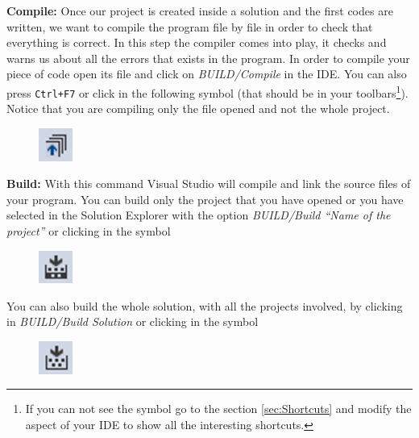 \begin{enumerate}
    \textbf{Compile:} Once our project is created inside a solution and the first codes are written, we want to compile the program file by file in order to check that everything is correct. In this step the compiler comes into play, it checks and warns us about all the errors that exists in the program. In order to compile your piece of code open its file and click on \textit{BUILD/Compile} in the IDE. You can also press \texttt{Ctrl+F7} or click in the following symbol (that should be in your toolbars\footnote{If you can not see the symbol go to the section \ref{sec:Shortcuts} and modify the aspect of your IDE to show all the interesting shortcuts.}). Notice that you are compiling only the file opened and not the whole project.
    
    \begin{figure}[H]
        \centering
        \includegraphics[width= 0.1\textwidth]{Figures/CompileSymbol}
    \end{figure}
    
    \textbf{Build:} With this command Visual Studio will compile and link the source files of your program. You can build only the project that you have opened or you have selected in the Solution Explorer with the option \textit{BUILD/Build ``Name of the project''} or clicking in the symbol 
    
    \begin{figure}[H]
        \centering
        \includegraphics[width= 0.1\textwidth]{Figures/Build1Symbol}
    \end{figure}
    
    You can also build the whole solution, with all the projects involved, by clicking in \textit{BUILD/Build Solution} or clicking in the symbol 
    
    \begin{figure}[H]
        \centering
        \includegraphics[width= 0.1\textwidth]{Figures/Build2Symbol}
    \end{figure}
    

\end{enumerate}
